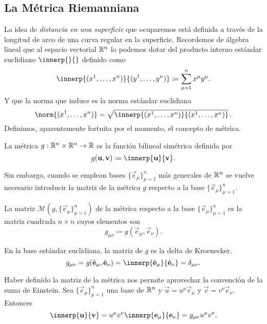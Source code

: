 \subsection{La Métrica Riemanniana}
La idea de \emph{distancia en una superficie} que ocuparemos está definida a través de la longitud de arco de una curva regular en la superficie. Recordemos de álgebra lineal que al espacio vectorial $\mathbb R^n$ lo podemos dotar del producto interno estándar euclidiano $\innerp{}{}$ definido como
\begin{equation}
	\innerp{(x^1, \dotsc, x^n)}{(y^1, \dotsc, y^n)} \coloneqq \sum_{\mu=1}^n x^\mu y^\mu.
\end{equation}
Y que la norma que induce es la norma estándar euclidiana
\begin{equation}
	\norm{(x^1, \dotsc, x^n)} = \sqrt{\innerp{(x^1, \dotsc, x^n)}{(x^1, \dotsc, x^n)} } \,.
\end{equation}
Definimos, aparentemente fortuita por el momento, el concepto de métrica.
\begin{definition}
	La métrica $g : \mathbb R^n \times \mathbb R^n \to \mathbb R$ es la función bilineal simétrica definida por
	\begin{equation}
		g(\vec u, \vec v) \coloneqq \innerp{\vec u}{\vec v}.
	\end{equation}
\end{definition}

Sin embargo, cuando se emplean bases $\{\vec e_\mu\}_{\mu=1}^n$ más generales de $\mathbb R^n$ se vuelve necesario introducir la matriz de la métrica $g$ respecto a la base $\{\vec e_\mu\}_{\mu=1}^n$.
\begin{definition}
	La matriz $\mathcal M(g, \{\vec e_\mu\}_{\mu=1}^n)$ de la métrica respecto a la base $\{\vec e_\mu\}_{\mu=1}^n$ es la matriz cuadrada $n \times n$ cuyos elementos son
	\begin{equation}
		g_{\mu\nu} \coloneqq g(\vec e_\mu, \vec e_\nu).
	\end{equation}
\end{definition}
\begin{remark}
	En la base estándar euclidiana, la matriz de $g$ es la delta de Kroenecker.
	\begin{equation}
		g_{\mu\nu} = g(\univ \mu, \univ \nu) = \innerp{\univ \mu}{\univ \nu} = \delta_{\mu\nu}.
	\end{equation}
\end{remark}
\begin{remark}
	Haber definido la matriz de la métrica nos permite aprovechar la convención de la suma de Einstein. Sea $\{\vec e_\mu\}_{\mu=1}^n$ una base de $\mathbb R^n$ y $\vec u = u^\mu \vec e_\mu$ y $\vec v = v^\nu \vec e_\nu$. Entonces
	\begin{equation}
		\innerp{\vec u}{\vec v} = u^\mu v^\nu \innerp{\vec e_\mu}{\vec e_\nu} = g_{\mu\nu}u^\mu v^\nu .
	\end{equation}
\end{remark}


